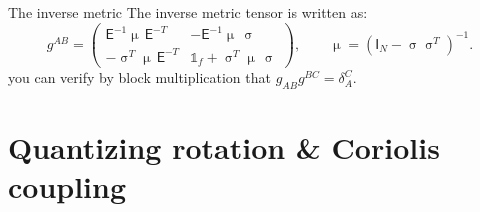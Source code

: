 \documentclass[aspectratio=169,10pt]{beamer}
\newcommand{\Mmu}{\upmu}        %
\newcommand{\Msig}{\upsigma}    %
\newcommand{\stagenum}{0}
\newcommand{\setstage}[1]{\renewcommand{\stagenum}{#1}}
\begin{document}
\begin{frame}{The inverse metric}
\setstage{3}
The inverse metric tensor is written as:
\begin{equation*}
\boxed{\;g^{AB}=
\begin{pmatrix}
\mathsf E^{-1}\Mmu\,\mathsf E^{-T} & -\mathsf E^{-1}\Mmu\,\Msig\\[3pt]
-\Msig^{T}\Mmu\,\mathsf E^{-T} & \mathbb 1_f+\Msig^{T}\Mmu\,\Msig
\end{pmatrix},
\qquad \Mmu=(\mathsf I_N-\Msig\Msig^{T})^{-1}.\;}\tag{4.22}
\end{equation*}
\footnotesize you can verify by block multiplication that $g_{AB}g^{BC}=\delta_A^C$.
\end{frame}

\section{Quantizing rotation \& Coriolis coupling}

\end{document}
